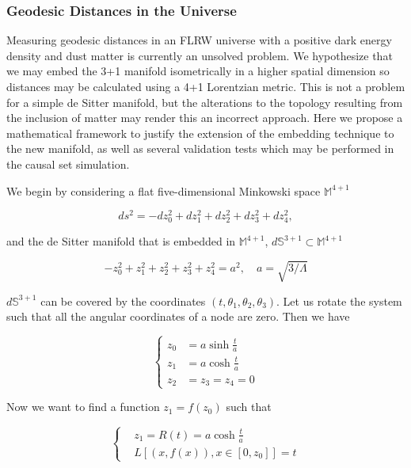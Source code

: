 \documentclass[preprint,notitlepage,amsmath,amssymb,floatfix]{revtex4-1}
\begin{document}
\subsubsection{Geodesic Distances in the Universe}
Measuring geodesic distances in an FLRW universe with a positive dark energy density and dust matter is currently an unsolved problem.  
We hypothesize that we may embed the 3+1 manifold isometrically in a higher spatial dimension so distances may be calculated using a 4+1 Lorentzian metric.  
This is not a problem for a simple de Sitter manifold, but the alterations to the topology resulting from the inclusion of matter may render this an incorrect approach.  
Here we propose a mathematical framework to justify the extension of the embedding technique to the new manifold, as well as several validation tests which may be performed in the causal set simulation. \par
We begin by considering a flat five-dimensional Minkowski space $\mathbb{M}^{4+1}$

\begin{equation}
ds^2 = -dz_0^2 + dz_1^2 + dz_2^2 + dz_3^2 + dz_4^2,
\end{equation}

\noindent and the de Sitter manifold that is embedded in $\mathbb{M}^{4+1}$, $d\mathbb{S}^{3+1}\subset\mathbb{M}^{4+1}$

\begin{equation}
-z_0^2 + z_1^2 + z_2^2 + z_3^2 + z_4^2 = a^2, \quad a = \sqrt{3/\Lambda}
\end{equation}

\noindent $d\mathbb{S}^{3+1}$ can be covered by the coordinates $\left(t,\theta_1,\theta_2,\theta_3\right)$.  Let us rotate the system such that all the angular coordinates of a node are zero.  
Then we have

\begin{equation}
\begin{cases}
z_0 &= a\sinh\frac{t}{a} \\
z_1 &= a\cosh\frac{t}{a} \\
z_2 &= z_3 = z_4 = 0
\end{cases}
\end{equation}

\noindent Now we want to find a function $z_1 = f\left(z_0\right)$ such that 

\begin{equation}
\label{eq:length}
\begin{cases}
&z_1 = R\left(t\right) = a\cosh\frac{t}{a} \\
&L\left[\left(x,f\left(x\right)\right), x\in\left[0,z_0\right]\right] = t
\end{cases}
\end{equation}
\end{document}
